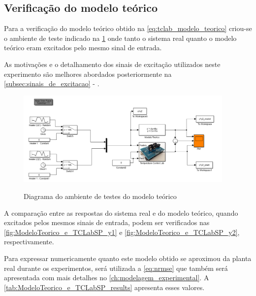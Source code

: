 \subsection{Verificação do modelo teórico}
\label{subsec:verificacao_do_modelo_teorico}

Para a verificação do modelo teórico obtido na \cref{eq:tclab_modelo_teorico} criou-se o ambiente de
teste indicado na \cref{fig:ModeloTeorico_e_TCLabSP_Simulink} onde tanto o sistema real quanto o modelo
teórico eram excitados pelo mesmo sinal de entrada.

As motivações e o detalhamento dos sinais de excitação utilizados neste experimento são melhores abordados
posteriormente na \cref{subsec:sinais_de_excitacao} - .

\begin{figure}[h]
	\caption{Diagrama do ambiente de testes do modelo teórico}
	\begin{center}
		\includegraphics[width=0.95\textwidth]{./5_images/ModeloTeorico_e_TCLabSP_Simulink.png} 
		\label{fig:ModeloTeorico_e_TCLabSP_Simulink}
	\end{center}
	\centering
\end{figure}

A comparação entre as respostas do sistema real e do modelo teórico, quando excitados pelos mesmos sinais
de entrada, podem ser verificados nas \cref{fig:ModeloTeorico_e_TCLabSP_y1} e \cref{fig:ModeloTeorico_e_TCLabSP_y2},
respectivamente.

Para expressar numericamente quanto este modelo obtido se aproximou da planta real durante os experimentos,
será utilizada a \cref{eq:nrmse} que também será apresentada com mais detalhes no \cref{ch:modelagem_experimental}.
A \cref{tab:ModeloTeorico_e_TCLabSP_results} apresenta esses valores.

